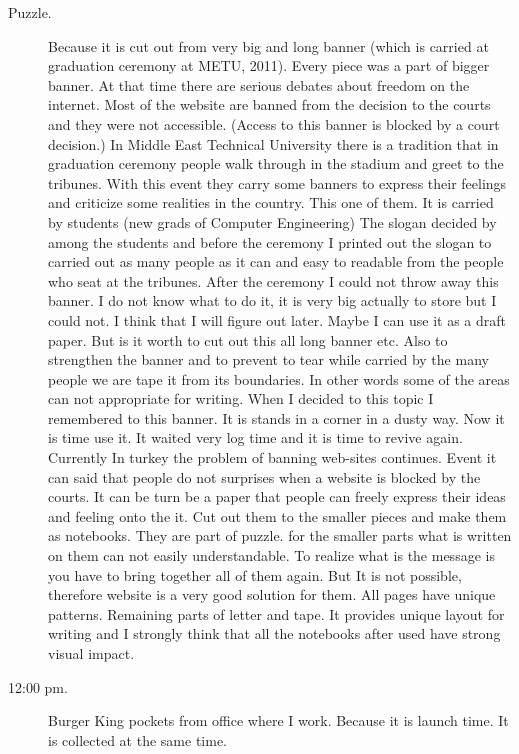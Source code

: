 \begin{description}
\item[Puzzle.] Because it is cut out from very big and long banner (which is carried at graduation ceremony at METU, 2011). Every piece was a part of bigger banner. At that time there are serious debates about freedom on the internet. Most of the website are banned from the decision to the courts and they were not accessible. (Access to this banner is blocked by a court decision.) In Middle East Technical University there is a tradition that in graduation ceremony people walk through in the stadium and greet to the tribunes. With this event they carry some banners to express their feelings and criticize some realities in the country. This one of them. It is carried by students (new grads of Computer Engineering) The slogan decided by among the students and before the ceremony I printed out the slogan to carried out as many people as it can and easy to readable from the people who seat at the tribunes. After the ceremony I could not throw away this banner. I do not know what to do it, it is very big actually to store but I could not. I think that I will figure out later. Maybe I can use it as a draft paper. But is it worth to cut out this all long banner etc. Also to strengthen the banner and to prevent to tear while carried by the many people we are tape it from its boundaries. In other words some of the areas can not appropriate for writing. When I decided to this topic I remembered to this banner. It is stands in a corner in a dusty way. Now it is time use it. It waited very log time and it is time to revive again. Currently In turkey the problem of banning web-sites continues. Event it can said that people do not surprises when a website is blocked by the courts. It can be turn be a paper that people can freely express their ideas and feeling onto the it. Cut out them to the smaller pieces and make them as notebooks. They are part of puzzle. for the smaller parts what is written on them can not easily understandable. To realize what is the message is you have to bring together all of them again. But It is not possible, therefore website is a very good solution for them. All pages have unique patterns. Remaining parts of letter and tape. It provides unique layout for writing and I strongly think that all the notebooks after used have strong visual impact. 

\item[12:00 pm.] Burger King pockets from office where I work. Because it is launch time. It is collected at the same time.


\end{description}
